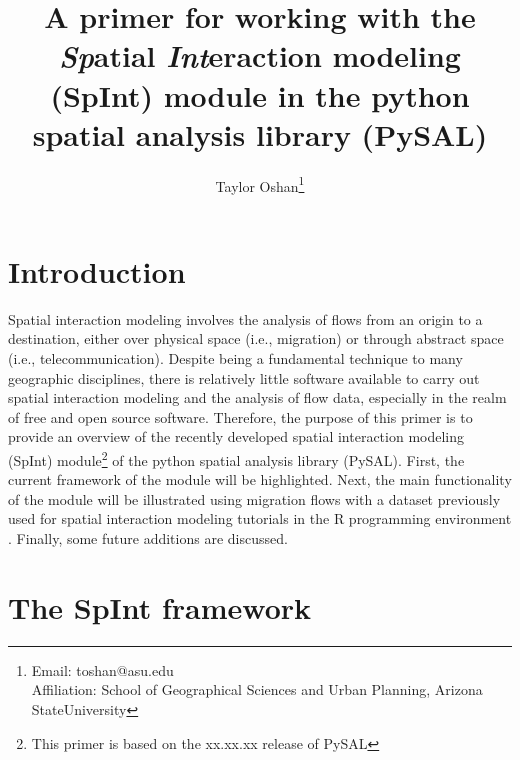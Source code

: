 \documentclass[11pt]{article}
\begin{document}
    
    \title{\texorpdfstring{A primer for working with the
\textbf{\emph{Sp}}atial \textbf{\emph{Int}}eraction modeling (SpInt)
module in the python spatial analysis library
(PySAL)}{A primer for working with the Spatial Interaction modeling (SpInt) module in the python spatial analysis library (PySAL)}}\label{a-primer-for-working-with-the-spatial-interaction-modeling-spint-module-in-the-python-spatial-analysis-library-pysal}

\author{Taylor Oshan\thanks{Email: toshan@asu.edu\\
\hspace*{2.0em}Affiliation: School of Geographical Sciences and Urban Planning, Arizona StateUniversity}}

    \maketitle
    




    \section{Introduction}\label{introduction}

    Spatial interaction modeling involves the analysis of flows from an
origin to a destination, either over physical space (i.e., migration) or
through abstract space (i.e., telecommunication). Despite being a
fundamental technique to many geographic disciplines, there is relatively
little software available to carry out spatial interaction modeling and
the analysis of flow data, especially in the realm of free and open source software. Therefore, the purpose of this primer is to
provide an overview of the recently developed spatial interaction
modeling (SpInt) module\footnote{This primer is based on the xx.xx.xx release of PySAL} of the python spatial analysis library (PySAL)\footnotemark. First, the current framework of the module will be highlighted. Next,
the main functionality of the module will be illustrated using migration
flows with a dataset previously used for spatial interaction modeling
tutorials in the R programming environment \citep{dennett_estimating_2012}. Finally, some future
additions are discussed.



    \section{The SpInt framework}\label{the-spint-framework}
\end{document}
